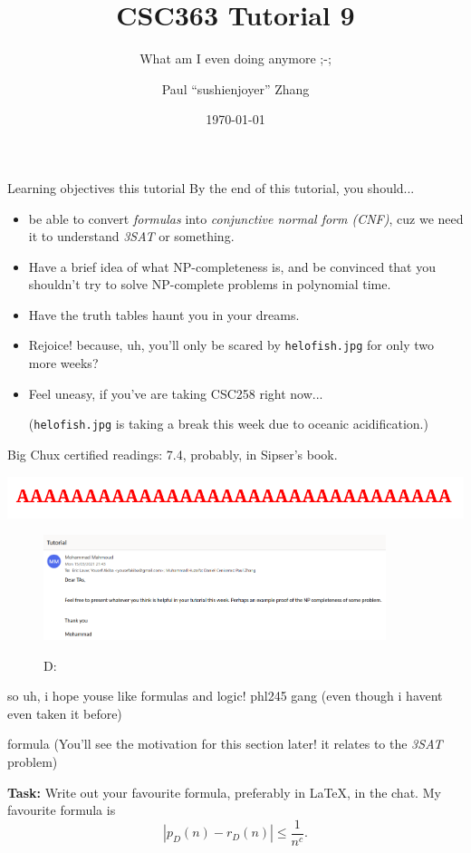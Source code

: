 \documentclass{beamer}
\title{CSC363 Tutorial 9}
\subtitle{What am I even doing anymore ;-;}
\date{\today}
\author{Paul ``sushi{\textunderscore}enjoyer'' Zhang}
\institute{University of Chux}
\begin{document}
\maketitle

\begin{frame}{Learning objectives this tutorial}
By the end of this tutorial, you should...
\begin{itemize}
\item be able to convert \textit{formulas} into \textit{conjunctive normal form (CNF)}, cuz we need it to understand \textit{3SAT} or something.
\item Have a brief idea of what NP-completeness is, and be convinced that you shouldn't try to solve NP-complete problems in polynomial time.
\item Have the truth tables haunt you in your dreams.
\item Rejoice! because, uh, you'll only be scared by \texttt{helo\textunderscore fish.jpg} for only two more weeks? 
\item Feel uneasy, if you've are taking CSC258 right now... 

(\texttt{helo\textunderscore fish.jpg} is taking a break this week due to oceanic acidification.)      
\end{itemize}
Big Chux certified readings: 7.4, probably, in Sipser's book.
\end{frame}

\begin{frame}{\includegraphics{img/a.png}}
\begin{figure}[h]
\centering
\includegraphics[width=10cm]{img/helpme.png}

D:
\end{figure}

so uh, i hope youse like formulas and logic! phl245 gang \emojisunglasses (even though i havent even taken it before)
\end{frame}

\begin{frame}{formula}
(You'll see the motivation for this section later! it relates to the \textit{3SAT} problem)

\vspace{2mm}

\textbf{Task:} Write out your favourite formula, preferably in \LaTeX, in the chat. My favourite formula is
$$|p_D(n) - r_D(n)| \leq \frac{1}{n^c}.$$
\end{frame}
\end{document}

